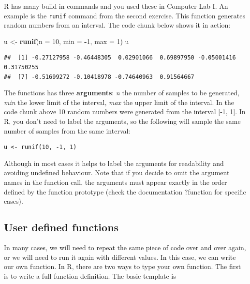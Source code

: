\documentclass[
]{book}
\newenvironment{Shaded}{\begin{snugshade}}{\end{snugshade}}
\newcommand{\AttributeTok}[1]{\textcolor[rgb]{0.13,0.29,0.53}{#1}}
\newcommand{\DecValTok}[1]{\textcolor[rgb]{0.00,0.00,0.81}{#1}}
\newcommand{\FunctionTok}[1]{\textcolor[rgb]{0.13,0.29,0.53}{\textbf{#1}}}
\newcommand{\NormalTok}[1]{#1}
\newcommand{\OtherTok}[1]{\textcolor[rgb]{0.56,0.35,0.01}{#1}}
\newcommand{\SpecialCharTok}[1]{\textcolor[rgb]{0.81,0.36,0.00}{\textbf{#1}}}
\theoremstyle{definition}
\theoremstyle{definition}
\theoremstyle{definition}
\theoremstyle{definition}
\theoremstyle{remark}
\begin{document}
R has many build in commands and you used these in Computer Lab I. An example is the \texttt{runif} command from the second exercise. This function generates random numbers from an interval. The code chunk below shows it in action:

\begin{Shaded}
\begin{Highlighting}[]
\NormalTok{u }\OtherTok{\textless{}{-}} \FunctionTok{runif}\NormalTok{(}\AttributeTok{n =} \DecValTok{10}\NormalTok{, }\AttributeTok{min =} \SpecialCharTok{{-}}\DecValTok{1}\NormalTok{, }\AttributeTok{max =} \DecValTok{1}\NormalTok{)}
\NormalTok{u}
\end{Highlighting}
\end{Shaded}

\begin{verbatim}
##  [1] -0.27127958 -0.46448305  0.02901066  0.69897950 -0.05001416  0.31750255
##  [7] -0.51699272 -0.10418978 -0.74640963  0.91564667
\end{verbatim}

The functions has three \textbf{arguments}: \emph{n} the number of samples to be generated, \emph{min} the lower limit of the interval, \emph{max} the upper limit of the interval. In the code chunk above 10 random numbers were generated from the interval {[}-1, 1{]}. In R, you don't need to label the arguments, so the following will sample the same number of samples from the same interval:

\begin{verbatim}
u <- runif(10, -1, 1)
\end{verbatim}

Although in most cases it helps to label the arguments for readability and avoiding undefined behaviour. Note that if you decide to omit the argument names in the function call, the arguments must appear exactly in the order defined by the function prototype (check the documentation ?function for specific cases).

\hypertarget{user-defined-functions}{%
\subsection{User defined functions}\label{user-defined-functions}}

In many cases, we will need to repeat the same piece of code over and over again, or we will need to run it again with different values. In this case, we can write our own function. In R, there are two ways to type your own function. The first is to write a full function definition. The basic template is
\end{document}
